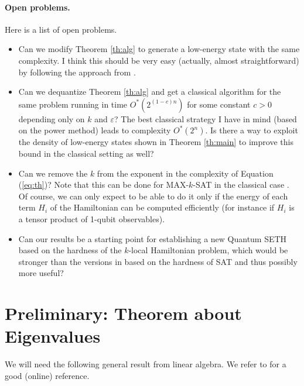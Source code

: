 \documentclass[11pt,a4paper]{article}
\theoremstyle{plain}
\theoremstyle{definition}
\begin{document}
\paragraph{Open problems.} Here is a list of open problems.
\begin{itemize}
	\item 
	Can we modify Theorem \ref{th:alg} to generate a low-energy state with the same complexity. I think this should be very easy (actually, almost straightforward) by following the approach from \cite[Section 2]{Lin+20}.
	\item 
	Can we dequantize Theorem \ref{th:alg} and get a classical algorithm for the same problem running in time $O^\ast(2^{(1-c)n})$ for some constant $c>0$ depending only on $k$ and $\varepsilon$? The best classical strategy I have in mind (based on the power method) leads to complexity $O^\ast(2^{n})$. Is there a way to exploit the density of low-energy states shown in Theorem \ref{th:main} to improve this bound in the classical setting as well?
	\item 
	Can we remove the $k$ from the exponent in the complexity of Equation (\ref{eq:th})? Note that this can be done for MAX-$k$-SAT in the classical case \cite{Alman+SODA20,Escoffier+14}. Of course, we can only expect to be able to do it only if the energy of each term $H_i$ of the Hamiltonian can be computed efficiently (for instance if $H_i$ is a tensor product of 1-qubit observables).
	\item 
	Can our results be a starting point for establishing a new Quantum SETH based on the hardness of the $k$-local Hamiltonian problem, which would be stronger than the versions in \cite{Aaronson+20,Buhrman+21,Buhrman+22,Chen+23} based on the hardness of SAT and thus possibly more useful?
	
\end{itemize}


\section{Preliminary: Theorem about Eigenvalues}

We will need the following general result from linear algebra. We refer to \cite{Higham} for a good (online) reference.
\end{document}
